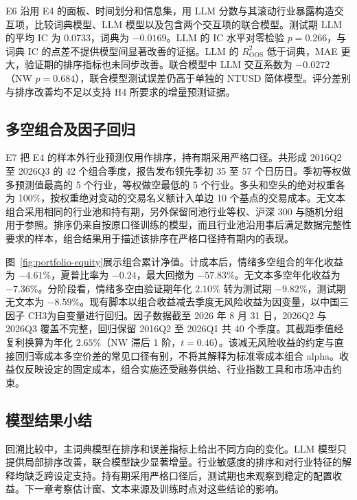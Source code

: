 E6 沿用 E4 的面板、时间划分和信息集，用 LLM 分数与其滚动行业暴露构造交互项，比较词典模型、LLM 模型以及包含两个交互项的联合模型。测试期 LLM 的平均 IC 为 0.0733，词典为 $-0.0169$。LLM 的 IC 水平对零检验 $p=0.266$，与词典 IC 的点差不提供模型间显著改善的证据。LLM 的 $R^2_{\mathrm{OOS}}$ 低于词典，MAE 更大，验证期的排序指标也未同步改善。联合模型中 LLM 交互系数为 $-0.0272$（NW $p=0.684$），联合模型测试误差仍高于单独的 NTUSD 简体模型。评分差别与排序改善均不足以支持 H4 所要求的增量预测证据。

\subsection{多空组合及因子回归}

E7 把 E4 的样本外行业预测仅用作排序，持有期采用严格口径。共形成 2016Q2 至 2026Q3 的 42 个组合季度，报告发布领先季初 35 至 57 个日历日。季初等权做多预测值最高的 5 个行业，等权做空最低的 5 个行业。多头和空头的绝对权重各为 100\%，按权重绝对变动的交易名义额计入单边 10 个基点的交易成本。无文本组合采用相同的行业池和持有期，另外保留同池行业等权、沪深 300 与随机分组用于参照。排序仍来自按原口径训练的模型，而且行业池沿用事后满足数据完整性要求的样本，组合结果用于描述该排序在严格口径持有期内的表现。

图~\ref{fig:portfolio-equity}展示组合累计净值。计成本后，情绪多空组合的年化收益为 $-4.61\%$，夏普比率为 $-0.24$，最大回撤为 $-57.83\%$。无文本多空年化收益为 $-7.36\%$。分阶段看，情绪多空由验证期年化 $2.10\%$ 转为测试期 $-9.82\%$，测试期无文本为 $-8.59\%$。现有脚本以组合收益减去季度无风险收益为因变量，以中国三因子 CH3\cite{liuStambaughYuan2019}为自变量进行回归。因子数据截至 2026 年 8 月 31 日，2026Q2 与 2026Q3 覆盖不完整，回归保留 2016Q2 至 2026Q1 共 40 个季度。其截距季值经复利换算为年化 $2.65\%$（NW 滞后 1 阶，$t=0.46$）。该减无风险收益的约定与直接回归零成本多空价差的常见口径有别，不将其解释为标准零成本组合 alpha。收益仅反映设定的固定成本，组合实施还受融券供给、行业指数工具和市场冲击约束。


\subsection{模型结果小结}

回溯比较中，主词典模型在排序和误差指标上给出不同方向的变化。LLM 模型只提供局部排序改善，联合模型缺少显著增量。行业敏感度的排序和对行业特征的解释均缺乏跨设定支持。持有期采用严格口径后，测试期也未观察到稳定的配置收益。下一章考察估计窗、文本来源及训练时点对这些结论的影响。

